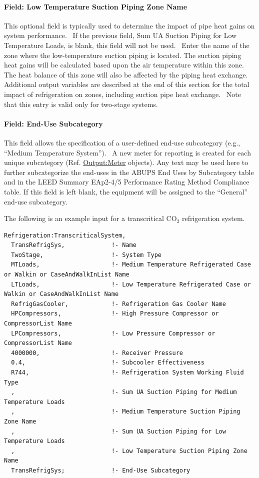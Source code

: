 \paragraph{Field: Low Temperature Suction Piping Zone Name}\label{field-low-temperature-suction-piping-zone-name}

This optional field is typically used to determine the impact of pipe heat gains on system performance.~ If the previous field, Sum UA Suction Piping for Low Temperature Loads, is blank, this field will not be used.~ Enter the name of the zone where the low-temperature suction piping is located. The suction piping heat gains will be calculated based upon the air temperature within this zone.~ The heat balance of this zone will also be affected by the piping heat exchange.~ Additional output variables are described at the end of this section for the total impact of refrigeration on zones, including suction pipe heat exchange.~ Note that this entry is valid only for two-stage systems.

\paragraph{Field: End-Use Subcategory}\label{field-end-use-subcategory-2-002}

This field allows the specification of a user-defined end-use subcategory (e.g., ``Medium Temperature System'').~ A new meter for reporting is created for each unique subcategory (Ref. \hyperref[outputmeter-and-outputmetermeterfileonly]{Output:Meter} objects). Any text may be used here to further subcategorize the end-uses in the ABUPS End Uses by Subcategory table and in the LEED Summary EAp2-4/5 Performance Rating Method Compliance table. If this field is left blank, the equipment will be assigned to the ``General'' end-use subcategory.

The following is an example input for a transcritical CO\(_{2}\) refrigeration system.

\begin{lstlisting}
Refrigeration:TranscriticalSystem,
  TransRefrigSys,             !- Name
  TwoStage,                   !- System Type
  MTLoads,                    !- Medium Temperature Refrigerated Case or Walkin or CaseAndWalkInList Name
  LTLoads,                    !- Low Temperature Refrigerated Case or Walkin or CaseAndWalkInList Name
  RefrigGasCooler,            !- Refrigeration Gas Cooler Name
  HPCompressors,              !- High Pressure Compressor or CompressorList Name
  LPCompressors,              !- Low Pressure Compressor or CompressorList Name
  4000000,                    !- Receiver Pressure
  0.4,                        !- Subcooler Effectiveness
  R744,                       !- Refrigeration System Working Fluid Type
  ,                           !- Sum UA Suction Piping for Medium Temperature Loads
  ,                           !- Medium Temperature Suction Piping Zone Name
  ,                           !- Sum UA Suction Piping for Low Temperature Loads
  ,                           !- Low Temperature Suction Piping Zone Name
  TransRefrigSys;             !- End-Use Subcategory
\end{lstlisting}

